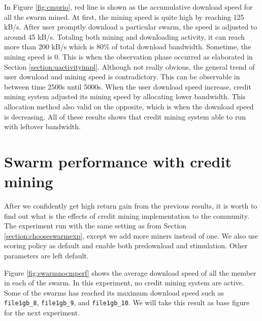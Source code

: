 In Figure \ref{fig:cmprio}, red line is shown as the accumulative download speed for all the swarm mined. At first, the mining speed is quite high by reaching 125 kB/s. After user promptly download a particular swarm, the speed is adjusted to around 45 kB/s. Totaling both mining and downloading activity, it can reach more than 200 kB/s which is 80\% of total download bandwidth. Sometime, the mining speed is 0. This is when the observation phase occurred as elaborated in Section \ref{section:uactivityimpl}. Although not really obvious, the general trend of user download and mining speed is contradictory. This can be observable in between time 2500s until 5000s. When the user download speed increase, credit mining system adjusted its mining speed by allocating lower bandwidth. This allocation method also valid on the opposite, which is when the download speed is decreasing. All of these results shows that credit mining system able to run with leftover bandwidth. 

\section{Swarm performance with credit mining}
\label{section:swperf}
After we confidently get high return gain from the previous results, it is worth to find out what is the effects of credit mining implementation to the community. The experiment run with the same setting as from Section \ref{section:chooseswarmexp}, except we add more miners instead of one. We also use scoring policy as default and enable both predownload and stimulation. Other parameters are left default. 

Figure \ref{fig:swarmnocmperf} shows the average download speed of all the member in each of the swarm. In this experiment, no credit mining system are active. Some of the swarms has reached its maximum download speed such as \texttt{file1gb\_8}, \texttt{file1gb\_9}, and \texttt{file1gb\_10}. We will take this result as base figure for the next experiment.

